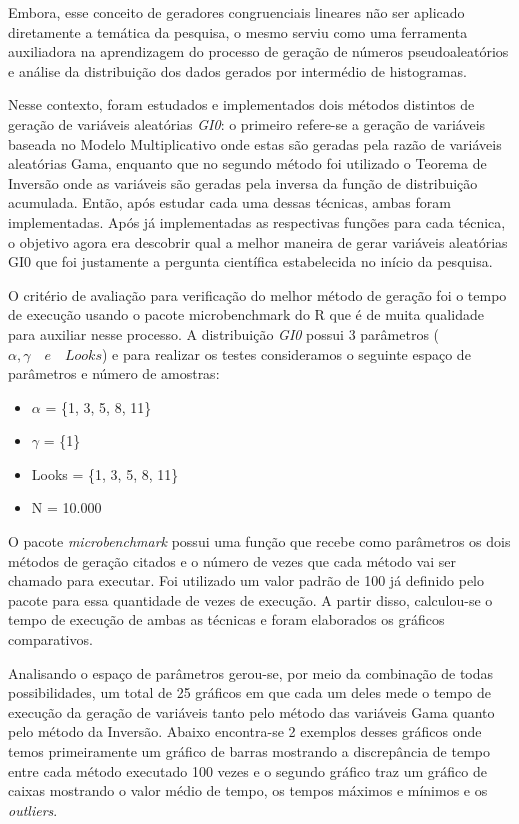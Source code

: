 \documentclass[12pt,letterpaper]{article}
\begin{document}
Embora, esse conceito de geradores congruenciais lineares não ser aplicado diretamente a temática da pesquisa, o mesmo serviu como uma ferramenta auxiliadora na aprendizagem do processo de geração de números pseudoaleatórios e análise da distribuição dos dados gerados por intermédio de histogramas.

Nesse contexto, foram estudados e implementados dois métodos distintos de geração de variáveis aleatórias \textit{GI0}: o primeiro refere-se a geração de variáveis baseada no Modelo Multiplicativo onde estas são geradas pela razão de variáveis aleatórias Gama, enquanto que no segundo método foi utilizado o Teorema de Inversão onde as variáveis são geradas pela inversa da função de distribuição acumulada. Então, após estudar cada uma dessas técnicas, ambas foram implementadas. Após já implementadas as respectivas funções para cada técnica, o objetivo agora era descobrir qual a melhor maneira de gerar variáveis aleatórias GI0 que foi justamente a pergunta científica estabelecida no início da pesquisa.

O critério de avaliação para verificação do melhor método de geração foi o tempo de execução usando o  pacote microbenchmark do R que é de muita qualidade para auxiliar nesse processo. A distribuição \emph{GI0} possui 3 parâmetros (\begin{math}
\alpha, \gamma \quad e \quad \textit{Looks}
\end{math}) e para realizar os testes consideramos o seguinte espaço de parâmetros e número de amostras:

\begin{itemize}
\item{$\alpha$ = \{1, 3, 5, 8, 11\} }
\item{$\gamma$ = \{1\}}
\item{Looks = \{1, 3, 5, 8, 11\}}
\item{N = 10.000}
\end{itemize}

O pacote \textit{microbenchmark} possui uma função que recebe como parâmetros os dois métodos de geração citados e o número de vezes que cada método vai ser chamado para executar. Foi utilizado um valor padrão de 100 já definido pelo pacote para essa quantidade de vezes de execução. A partir disso, calculou-se o tempo de execução de ambas as técnicas e foram elaborados os gráficos comparativos.

Analisando o espaço de parâmetros gerou-se, por meio da combinação de todas possibilidades, um total de 25 gráficos em que cada um deles mede o tempo de execução da geração de variáveis tanto pelo método das variáveis Gama quanto pelo método da Inversão. Abaixo encontra-se 2 exemplos desses gráficos onde temos primeiramente um gráfico de barras mostrando a discrepância de tempo entre cada método executado 100 vezes e o segundo gráfico traz um gráfico de caixas mostrando o valor médio de tempo, os tempos máximos e mínimos e os \textit{outliers}.
\end{document}
